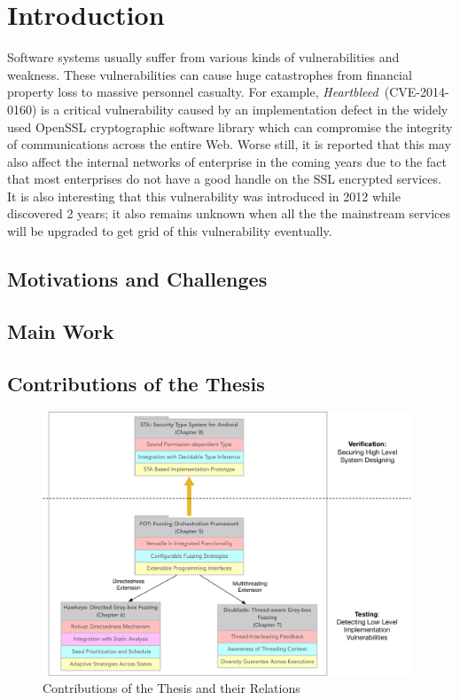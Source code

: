 
\chapter{Introduction} \label{ch:introduction}

Software systems usually suffer from various kinds of vulnerabilities and weakness. These vulnerabilities can cause huge catastrophes from financial property loss to massive personnel casualty. For example, \emph{Heartbleed}~\cite{heartbleed}(CVE-2014-0160) is a critical vulnerability caused by an implementation defect in the widely used OpenSSL cryptographic software library which can compromise the integrity of communications across the entire Web. Worse still, it is reported that this may also affect the internal networks of enterprise in the coming years due to the fact that most enterprises do not have a good handle on the SSL encrypted services. It is also interesting that this vulnerability was introduced in 2012 while discovered 2 years; it also remains unknown when all the the mainstream services will be upgraded to get grid of this vulnerability eventually. 


\section{Motivations and Challenges}

\section{Main Work}

\section{Contributions of the Thesis}

\begin{figure}[ht]
	\begin{center}
		\includegraphics[width=0.98\textwidth]{res/contributions}
		\caption{Contributions of the Thesis and their Relations}
		\label{fig:works}
	\end{center}
\end{figure}


